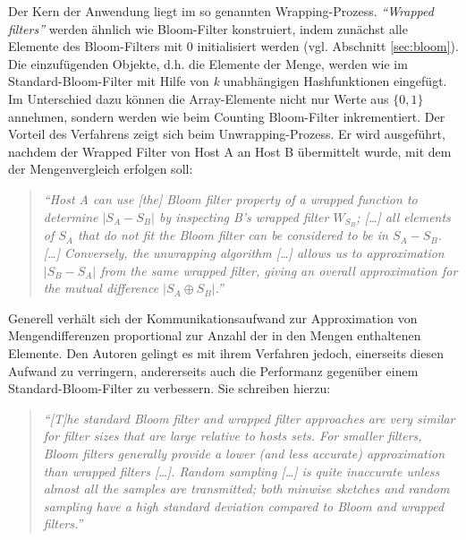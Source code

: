 Der Kern der Anwendung liegt im so genannten Wrapping-Prozess. \textit{"`Wrapped filters"'} \cite{Agarwal2006} werden ähnlich wie Bloom-Filter konstruiert, indem zunächst alle Elemente des Bloom-Filters mit 0 initialisiert werden (vgl. Abschnitt \ref{sec:bloom}). Die einzufügenden Objekte, d.h. die Elemente der Menge, werden wie im Standard-Bloom-Filter mit Hilfe von \textit{k} unabhängigen Hashfunktionen eingefügt. Im Unterschied dazu können die Array-Elemente nicht nur Werte aus $\{0,1\}$ annehmen, sondern werden wie beim Counting Bloom-Filter inkrementiert. Der Vorteil des Verfahrens zeigt sich beim Unwrapping-Prozess. Er wird ausgeführt, nachdem der Wrapped Filter von Host A an Host B übermittelt wurde, mit dem der Mengenvergleich erfolgen soll: 
\begin{quote}
\textit{"`Host A can use [the] Bloom filter property of a wrapped function to determine $|S_A - S_B|$ by inspecting B's wrapped filter $W_{S_B}$; [\dots] all elements of $S_A$ that do not fit the Bloom filter can be considered to be in $S_A - S_B$. [\dots] Conversely, the unwrapping algorithm [\dots] allows us to approximation $|S_B - S_A|$ from the same wrapped filter, giving an overall approximation for the mutual difference $|S_A\oplus S_B|$."'} \cite{Agarwal2006}
\end{quote}
Generell verhält sich der Kommunikationsaufwand zur Approximation von Mengendifferenzen proportional zur Anzahl der in den Mengen enthaltenen Elemente. Den Autoren gelingt es mit ihrem Verfahren jedoch, einerseits diesen Aufwand zu verringern, andererseits auch die Performanz gegenüber einem Standard-Bloom-Filter zu verbessern. Sie schreiben hierzu: 
\begin{quote}
\textit{"`[T]he standard Bloom filter and wrapped filter approaches are very similar for filter sizes that are large relative to hosts sets. For smaller filters, Bloom filters generally provide a lower (and less accurate) approximation than wrapped filters [\dots]. Random sampling [\dots] is quite inaccurate unless almost all the samples are transmitted; both minwise sketches and random sampling have a high standard deviation compared to Bloom and wrapped filters."'} \cite{Agarwal2006}
\end{quote}
